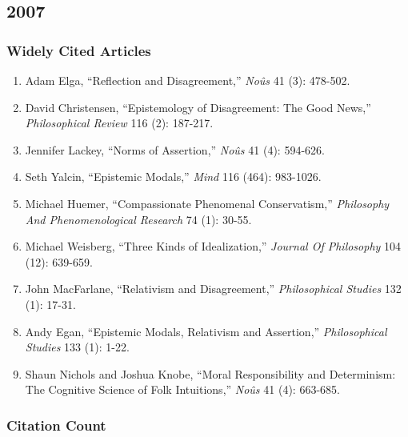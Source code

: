 \documentclass[
  10pt,
  letterpaper,
  DIV=11,
  numbers=noendperiod,
  twoside]{scrartcl}
\providecommand{\tightlist}{%
  \setlength{\itemsep}{0pt}\setlength{\parskip}{0pt}}\usepackage{longtable,booktabs,array}
\begin{document}
\newpage

\subsection{2007}\label{sec-s2007}

\subsubsection*{Widely Cited Articles}\label{widely-cited-articles-31}

\begin{enumerate}
\def\labelenumi{\arabic{enumi}.}
\tightlist
\item
  Adam Elga, ``Reflection and Disagreement,'' \emph{Noûs} 41 (3):
  478-502.
\item
  David Christensen, ``Epistemology of Disagreement: The Good News,''
  \emph{Philosophical Review} 116 (2): 187-217.
\item
  Jennifer Lackey, ``Norms of Assertion,'' \emph{Noûs} 41 (4): 594-626.
\item
  Seth Yalcin, ``Epistemic Modals,'' \emph{Mind} 116 (464): 983-1026.
\item
  Michael Huemer, ``Compassionate Phenomenal Conservatism,''
  \emph{Philosophy And Phenomenological Research} 74 (1): 30-55.
\item
  Michael Weisberg, ``Three Kinds of Idealization,'' \emph{Journal Of
  Philosophy} 104 (12): 639-659.
\item
  John MacFarlane, ``Relativism and Disagreement,'' \emph{Philosophical
  Studies} 132 (1): 17-31.
\item
  Andy Egan, ``Epistemic Modals, Relativism and Assertion,''
  \emph{Philosophical Studies} 133 (1): 1-22.
\item
  Shaun Nichols and Joshua Knobe, ``Moral Responsibility and
  Determinism: The Cognitive Science of Folk Intuitions,'' \emph{Noûs}
  41 (4): 663-685.
\end{enumerate}

\subsubsection*{Citation Count}\label{sec-count-2007}
\end{document}
